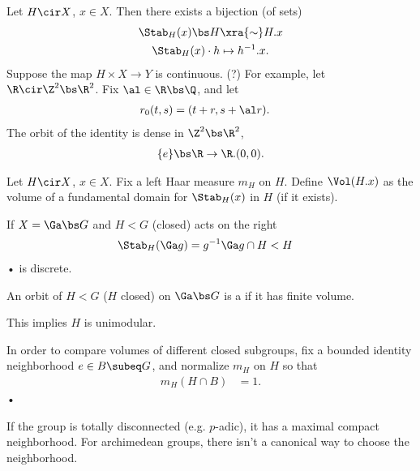 Let $H\cir X$, $x\in X$. Then there exists a bijection (of sets) 
\begin{align}
\Stab_H(x) \bs H &\xra{\sim} H.x\\
\Stab_H(x) \cdot h &\mapsto h^{-1}.x.
\end{align}
Suppose the map $H\times X\to Y$ is continuous. (?) For example, let $\R\cir \Z^2\bs \R^2$. 
Fix $\al\in \R\bs \Q$, and let
\begin{align}
r_0(t,s) &= (t+r,s+\al r).
\end{align}
The orbit of the identity is dense in $\Z^2\bs \R^2$,
\begin{align}
\{e\}\bs \R \to \R.(0,0).
\end{align}
\begin{df}
Let $H\cir X$, $x\in X$. Fix a left Haar measure $m_H$ on $H$. Define $\Vol(H.x)$ as the volume of a fundamental domain for $\Stab_H(x)$ in $H$ (if it exists).
\end{df}
 If $X=\Ga\bs G$ and $H<G$ (closed) acts on the right
\begin{align}
\Stab_H(\Ga g) &= g^{-1}\Ga g\cap H<H
\end{align}•
is discrete. 
\begin{df}
An orbit of $H<G$ ($H$ closed) on $\Ga\bs G$ is a  if it has finite volume. 
\end{df}
This implies $H$ is unimodular.
\begin{rem}
In order to compare volumes of different closed subgroups, fix a bounded %
identity neighborhood $e\in B\subeq G$, and normalize $m_H$ on $H$ so that 
\begin{align}
m_H(H\cap B)&=1.
\end{align}•
\end{rem}
%
If the group is totally disconnected (e.g. $p$-adic), it has a maximal compact neighborhood. For archimedean groups, there isn't a canonical way to choose the neighborhood.


